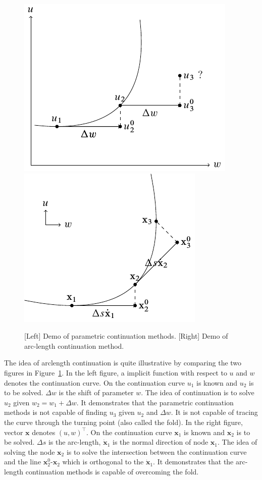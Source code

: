 \documentclass[10pt,letterpaper]{article}
\begin{document}
\begin{figure}[ht!]
	\centering
	\includegraphics[scale=1]{figure/demo_parametric_continuation/tikz}
	\includegraphics[scale=1]{figure/demo_arc-length_continuation/tikz}
	\caption{[Left] Demo of parametric continuation methods. [Right] Demo of arc-length continuation method. }
	\label{continuation/demo_arc-length_continuation}
\end{figure}

The idea of arclength continuation is quite illustrative by comparing the two figures in  Figure~\ref{continuation/demo_arc-length_continuation}. 
In the left figure, a implicit function with respect to $u$ and $w$ denotes the continuation curve. On the continuation curve $u_1$ is known and $u_2$ is to be solved. $\Delta w$ is the shift of parameter $w$. The idea of continuation is to solve $u_2$ given $w_2=w_1+\Delta w$. It demonstrates that the parametric continuation methods is not capable of finding $u_3$ given $u_2$ and $\Delta w$. It is not capable of tracing the curve through the turning point (also called the fold). 
In the right figure, vector $\mathbf x$ denotes $(u,w)^\top$. On the continuation curve $\mathbf x_1$ is known and $\mathbf x_2$ is to be solved. $\Delta s$ is the arc-length, $\dot{\mathbf x}_1$ is the normal direction of node $\mathbf x_1$. The idea of solving the node $\mathbf x_2$ is to solve the intersection between the continuation curve and the line $\mathbf x_2^0$-$\mathbf x_2$ which is orthogonal to the $\dot{\mathbf x}_1$. It demonstrates that the arc-length continuation methods is capable of overcoming the fold.
\end{document}
